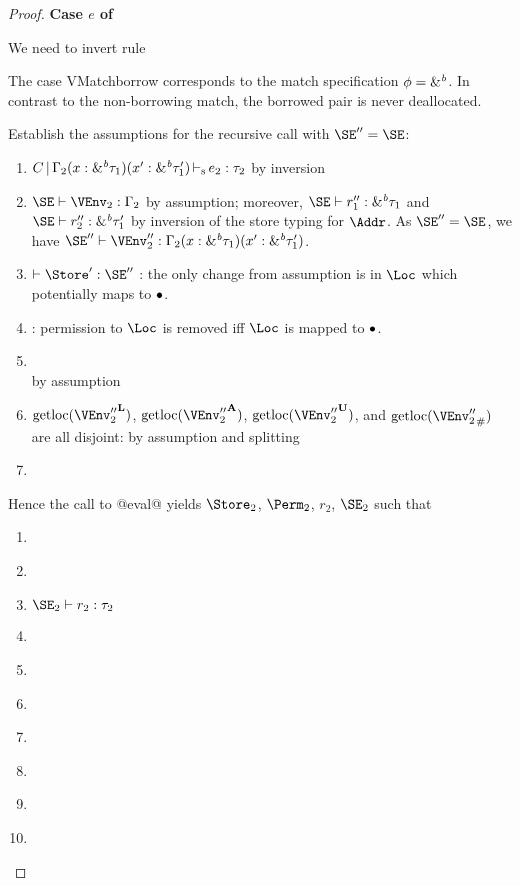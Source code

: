 \begin{proof}
  \newpage
  \textbf{Case $e$ of}

  We need to invert rule 
  \begin{mathpar}
  \end{mathpar}
  The case VMatchborrow corresponds to the match specification
  $\etransfm = \&^{\BORROW}$.
  In contrast to the non-borrowing match, the borrowed pair is never deallocated.

  Establish the assumptions for the recursive call
  with  $\SE'' = \SE$:
  \begin{enumerate}[({A1-}1)]
  \item $\inferS{C}{\E_2 (x:\borrow{\tau_1}) (x':\borrow{\tau'_1})}{e_2}{\tau_2}$ by inversion
  \item $\SE \vdash \VEnv_2 : \E_2$  by assumption; moreover, $\SE
    \vdash r_1'' : \borrow{\tau_1}$ and $\SE \vdash r_2'' : \borrow{\tau'_1}$ by inversion
    of the store typing for $\Addr$. As $\SE''=\SE$, we have $\SE'' \vdash \VEnv_2'' : \E_2 (x:\borrow{\tau_1}) (x':\borrow{\tau_1'})$.
  \item $\vdash \Store' : \SE''$ : the only change from assumption is in
    $\Loc$ which potentially maps to $\StFreed$.
  \item {} : permission to $\Loc$ is removed iff
    $\Loc$ is mapped to $\StFreed$.
  \item {} \\
    by assumption
  \item $\Rawloc{\Active{\VEnv''_2}}$,
    $\Rawloc{\MutableBorrows{\VEnv''_2}}$,
    $\Rawloc{\ImmutableBorrows{\VEnv''_2}}$, and
    $\Rawloc{\Suspended{\VEnv''_2}}$ are all disjoint: by assumption
    and splitting
  \item {}
  \end{enumerate}

  Hence the call to @eval@ yields
  $\Store_2$, $\Perm_2$, $r_2$, $\SE_2$ such that
  \begin{enumerate}[({R1-}1)]
  \item {}
  \item\label{item:1} 
  \item\label{item:3} $\SE_2 \vdash r_2 : \tau_2$
  \item\label{item:4} 
  \item\label{item:5} 
  \item\label{item:6} 
  \item\label{item:7} 
  \item\label{item:34} 
  \item\label{item:35} 
  \item\label{item:36} 
  \end{enumerate}


\end{proof}
